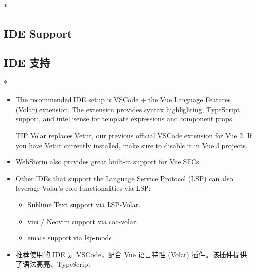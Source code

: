 \begin{paracol}{2}
 
\switchcolumn[0]*%
\subsection{IDE Support}
\switchcolumn
\subsection{IDE 支持}
\switchcolumn[0]*%
\begin{itemize}
\item
  The recommended IDE setup is
  \href{https://code.visualstudio.com/}{VSCode} + the
  \href{https://marketplace.visualstudio.com/items?itemName=Vue.volar}{Vue
  Language Features (Volar)} extension. The extension provides syntax
  highlighting, TypeScript support, and intellisense for template
  expressions and component props.
\begin{vueQuote}{TIP}
  Volar replaces
  \href{https://marketplace.visualstudio.com/items?itemName=octref.vetur}{Vetur},
  our previous official VSCode extension for Vue 2. If you have Vetur
  currently installed, make sure to disable it in Vue 3 projects.
\end{vueQuote} 
\item
  \href{https://www.jetbrains.com/webstorm/}{WebStorm} also provides
  great built-in support for Vue SFCs.
\item
  Other IDEs that support the
  \href{https://microsoft.github.io/language-server-protocol/}{Language
  Service Protocol} (LSP) can also leverage Volar's core functionalities
  via LSP:
  \begin{itemize}
  \item
    Sublime Text support via
    \href{https://github.com/sublimelsp/LSP-volar}{LSP-Volar}.
  \item
    vim / Neovim support via
    \href{https://github.com/yaegassy/coc-volar}{coc-volar}.
  \item
    emacs support via
    \href{https://emacs-lsp.github.io/lsp-mode/page/lsp-volar/}{lsp-mode}
  \end{itemize}
\end{itemize}
\switchcolumn
\begin{itemize}
\item
  推荐使用的 IDE 是 \href{https://code.visualstudio.com/}{VSCode}，配合
  \href{https://marketplace.visualstudio.com/items?itemName=Vue.volar}{Vue
  语言特性 (Volar)} 插件。该插件提供了语法高亮、TypeScript

\end{itemize}
\end{paracol}
